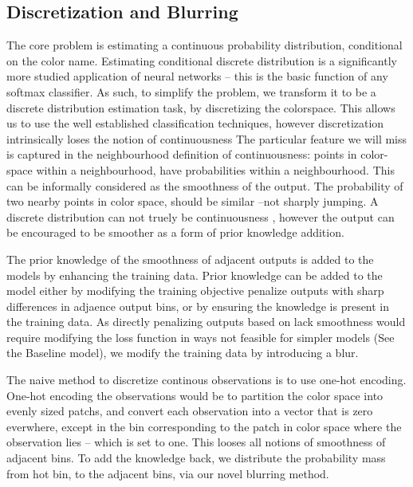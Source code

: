 \documentclass[11pt,letterpaper]{article}
\begin{document}
\subsection{Discretization and Blurring}
The core problem is estimating a continuous  probability distribution, conditional on the color name.
Estimating conditional discrete distribution is a significantly more studied application of neural networks
-- this is the basic function of any softmax classifier.
As such, to simplify the problem, we transform it to be a discrete distribution estimation task, by discretizing the colorspace.
This allows us to use the well established classification techniques,
however discretization intrinsically loses the notion of continuousness
The particular feature we will miss is captured in the neighbourhood definition of continuousness:
points in color-space within a neighbourhood, have probabilities within a neighbourhood.
This can be informally considered as the smoothness of the output.
The probability of two nearby points in color space, should be similar --not sharply jumping.
A discrete distribution can not truely be continuousness ,
however the output can be encouraged to be smoother as a form of prior knowledge addition.



The prior knowledge of the smoothness of adjacent outputs is added to the models by enhancing the training data.
Prior knowledge can be added to the model either by modifying the training objective penalize outputs with sharp differences in adjaence output bins,
or by ensuring the knowledge is present in the training data.
As directly penalizing outputs based on lack smoothness would require modifying the loss function in ways not feasible for simpler models (See the Baseline model),
we modify the training data by introducing a blur.

The naive method to discretize continous observations is to use one-hot encoding.
One-hot encoding the observations would be to partition the color space into evenly sized patchs, 
and convert each observation into a vector that is zero everwhere,
except in the bin corresponding to the patch in color space where the observation lies -- which is set to one.
This looses all notions of smoothness of adjacent bins.
To add the knowledge back, we distribute the probability mass from hot bin, to the adjacent bins, via our novel blurring method.
\end{document}
